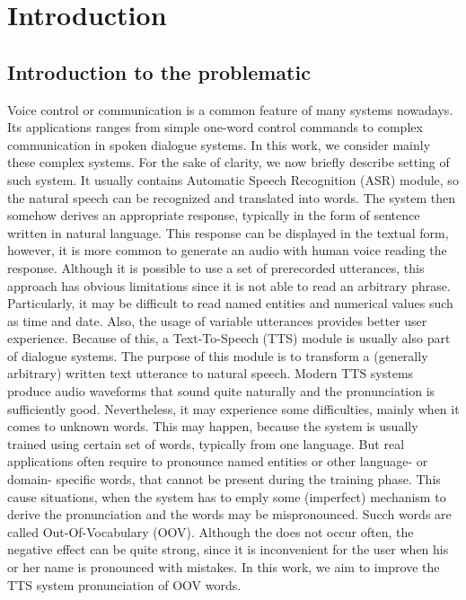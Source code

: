 \chapter{Introduction}

\section{Introduction to the problematic}
Voice control or communication is a common feature of many systems nowadays.
Its applications ranges from simple one-word control commands to complex communication in spoken dialogue systems.
In this work, we consider mainly these complex systems.
For the sake of clarity, we now briefly describe setting of such system.
It usually contains Automatic Speech Recognition (ASR) module, so the natural speech can be recognized and translated into words.
The system then somehow derives an appropriate response, typically in the form of sentence written in natural language.
This response can be displayed in the textual form, however, it is more common to generate an audio with human voice reading the response.
Although it is possible to use a set of prerecorded utterances, this approach has obvious limitations since it is not able to read an arbitrary phrase.
Particularly, it may be difficult to read named entities and numerical values such as time and date.
Also, the usage of variable utterances provides better user experience.
Because of this, a Text-To-Speech (TTS) module is usually also part of dialogue systems.
The purpose of this module is to transform a (generally arbitrary) written text utterance to natural speech.
Modern TTS systems produce audio waveforms that sound quite naturally and the pronunciation is sufficiently good.
Nevertheless, it may experience some difficulties, mainly when it comes to unknown words.
This may happen, because the system is usually trained using certain set of words, typically from one language.
But real applications often require to pronounce named entities or other language- or domain- specific words, that cannot be present during the training phase.
This cause situations, when the system has to emply some (imperfect) mechanism to derive the pronunciation and  the words may be mispronounced.
Succh words are called Out-Of-Vocabulary (OOV).
Although the does not occur often, the negative effect can be quite strong, since it is inconvenient for the user when his or her name is pronounced with mistakes.
\linebreak\linebreak
In this work, we aim to improve the TTS system pronunciation of OOV words.
